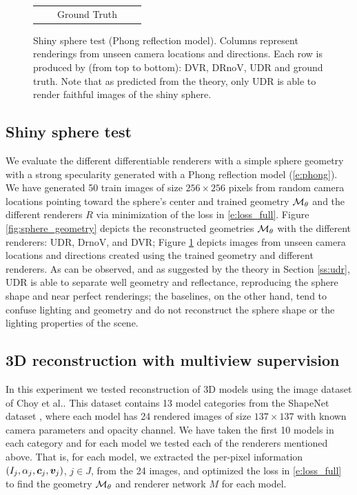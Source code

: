 \documentclass[runningheads]{llncs}
\begin{document}
\begin{figure}[t]
\begin{tabular}{ccccc}
         & & {Ground Truth} & & \\
    \end{tabular}
    \caption{Shiny sphere test (Phong reflection model). Columns represent renderings from unseen camera locations and directions. Each row is produced by (from top to bottom): DVR, DRnoV, UDR and ground truth. Note that as predicted from the theory, only UDR is able to render faithful images of the shiny sphere.}
    \label{fig:sphere_test_images}
\end{figure}

\subsection{Shiny sphere test}
We evaluate the different differentiable renderers with a simple sphere geometry with a strong specularity generated with a Phong reflection model (\eqref{e:phong}). We have generated 50 train images of size $256\times 256$ pixels from random camera locations pointing toward the sphere's center and trained geometry ${\mathcal{M}}_\theta$ and the different renderers $R$ via minimization of the loss in \eqref{e:loss_full}. Figure \ref{fig:sphere_geometry} depicts the reconstructed geometries ${\mathcal{M}}_\theta$ with the different renderers: UDR, DrnoV, and DVR; Figure \ref{fig:sphere_test_images} depicts images from unseen camera locations and directions created using the trained geometry and different renderers. As can be observed, and as suggested by the theory in Section \ref{ss:udr}, UDR is able to separate well geometry and reflectance, reproducing the sphere shape and near perfect renderings; the baselines, on the other hand, tend to confuse lighting and geometry and do not reconstruct the sphere shape or the lighting properties of the scene. 


 


\subsection{3D reconstruction with multiview supervision}\label{exp_recon}
In this experiment we tested reconstruction of 3D models using the image dataset of Choy et al.\cite{choy20163d}. This dataset contains 13 model categories from the ShapeNet dataset \cite{shapenet2015}, where each model has 24 rendered images of size $137\times 137$ with known camera parameters and opacity channel. We have taken the first 10 models in each category and for each model we tested each of the renderers mentioned above. That is, for each model, we extracted the per-pixel information $(I_j,\alpha_j,{\bm{c}}_j,{\bm{v}}_j)$, $j\in J$, from the 24 images, and optimized the loss in \eqref{e:loss_full} to find the geometry ${\mathcal{M}}_\theta$ and renderer network $M$ for each model.
\end{document}
